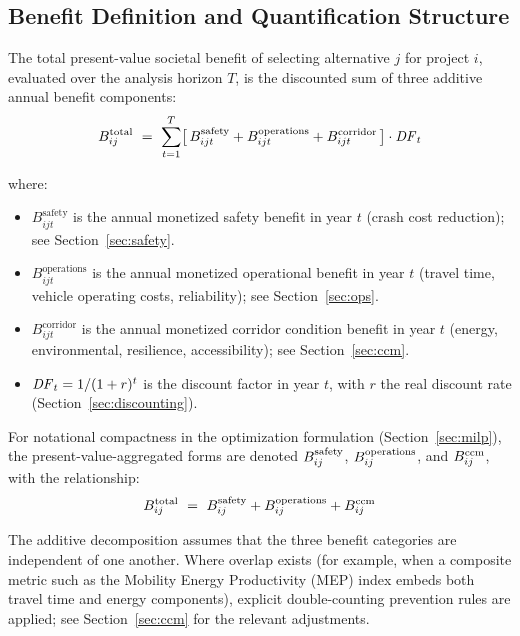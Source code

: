 \subsection{Benefit Definition and Quantification Structure}

The total present-value societal benefit of selecting alternative $j$ for
project $i$, evaluated over the analysis horizon $T$, is the discounted sum
of three additive annual benefit components:
\begin{equation}
B^{\mathrm{total}}_{ij}\ =\ \sum_{t=1}^{T}\bigl[\, B_{ijt}^{\mathrm{safety}} + B_{ijt}^{\mathrm{operations}} + B_{ijt}^{\mathrm{corridor}} \,\bigr] \cdot \mathit{DF}_t
\label{eq:btot}
\end{equation}

\noindent where:
\begin{itemize}[leftmargin=2em, itemsep=2pt]
  \item $B_{ijt}^{\mathrm{safety}}$ is the annual monetized safety benefit
    in year $t$ (crash cost reduction); see Section~\ref{sec:safety}.
  \item $B_{ijt}^{\mathrm{operations}}$ is the annual monetized operational
    benefit in year $t$ (travel time, vehicle operating costs, reliability);
    see Section~\ref{sec:ops}.
  \item $B_{ijt}^{\mathrm{corridor}}$ is the annual monetized corridor
    condition benefit in year $t$ (energy, environmental, resilience,
    accessibility); see Section~\ref{sec:ccm}.
  \item $\mathit{DF}_t = 1/(1+r)^t$ is the discount factor in year $t$, with $r$ the
    real discount rate (Section~\ref{sec:discounting}).
\end{itemize}

For notational compactness in the optimization formulation
(Section~\ref{sec:milp}), the present-value-aggregated forms are denoted
$B^{\mathrm{safety}}_{ij}$, $B^{\mathrm{operations}}_{ij}$, and $B^{\mathrm{ccm}}_{ij}$, with the relationship:
\begin{equation*}
B^{\mathrm{total}}_{ij}\ =\ B^{\mathrm{safety}}_{ij} + B^{\mathrm{operations}}_{ij} + B^{\mathrm{ccm}}_{ij}
\end{equation*}

The additive decomposition assumes that the three benefit categories are
independent of one another. Where overlap exists (for example, when a composite
metric such as the Mobility Energy Productivity (MEP) index embeds both travel
time and energy components), explicit double-counting prevention rules are
applied; see Section~\ref{sec:ccm} for the relevant adjustments.

